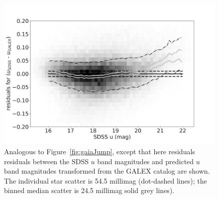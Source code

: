 \documentclass[fleqn,usenatbib]{mnras}
\begin{document}
\begin{figure}
    \centering\includegraphics[width=0.95\columnwidth]{figures/colorResidGALEXug_du_est_umag_Hess_lr.png}
\caption{Analogous to Figure~\ref{fig:gaiaJump}, except that here
  residuals residuals between the SDSS $u$ band magnitudes and
  predicted $u$ band magnitudes transformed from the GALEX catalog are
  shown.  The individual star scatter is 54.5 millimag (dot-dashed
  lines); the binned median scatter is 24.5 millimag solid grey
  lines).
}
\label{fig:GALEX_umag}
\end{figure}
\end{document}
